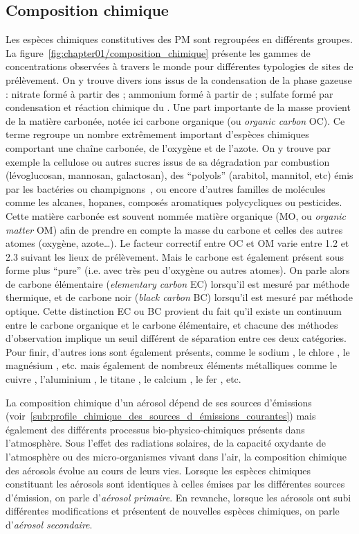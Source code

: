 \subsection{Composition chimique}%
\label{ssub:composition_chimique}

Les espèces chimiques constitutives des PM sont regroupées en différents groupes. La
figure~\ref{fig:chapter01/composition_chimique} présente les gammes de concentrations
observées à travers le monde pour différentes typologies de sites de prélèvement.
On y trouve divers ions issus de la condensation de la phase gazeuse : nitrate \NOt{} formé à
partir des ; ammonium \NHq{} formé à partir de \NHt; sulfate \SOq{} formé par
condensation et réaction chimique du .
Une part importante de la masse provient de la matière carbonée, notée ici
carbone organique (ou \textit{organic carbon} OC). Ce terme regroupe un nombre extrêmement
important d'espèces chimiques comportant une chaîne carbonée, de l'oxygène et
de l'azote. On y trouve par exemple la cellulose ou autres sucres issus de sa
dégradation par combustion (lévoglucosan, mannosan, galactosan), des ``polyols'' (arabitol,
mannitol, etc) émis par les bactéries ou champignons~\autocite{samakePolyols2019}, ou encore
d'autres familles de molécules comme les alcanes, hopanes, composés aromatiques
polycycliques ou pesticides. Cette matière carbonée est souvent nommée matière
organique (MO, ou \textit{organic matter} OM) afin de prendre en compte la masse du
carbone et celles des autres atomes (oxygène, azote…). Le facteur correctif entre OC et OM
varie entre 1.2 et 2.3 suivant les lieux de prélèvement.
Mais le carbone est également présent sous forme plus ``pure'' (i.e. avec très peu
d'oxygène ou autres atomes).
On parle alors de carbone élémentaire (\textit{elementary carbon} EC) lorsqu'il est mesuré
par méthode thermique, et de carbone noir (\textit{black carbon} BC) lorsqu'il est mesuré
par méthode optique. Cette distinction EC ou BC provient du fait qu'il existe un continuum
entre le carbone organique et le carbone élémentaire, et chacune des méthodes
d'observation implique un seuil différent de séparation entre ces deux catégories.
Pour finir, d'autres ions sont également présents, comme le sodium , le chlore
, le magnésium , etc. mais également de nombreux éléments métalliques
comme le cuivre , l'aluminium , le titane , le calcium , le fer
, etc.

La composition chimique d'un aérosol dépend de ses sources d'émissions
(voir~\ref{sub:profile_chimique_des_sources_d_émissions_courantes}) mais également des
différents processus bio-physico-chimiques présents dans l'atmosphère. Sous l'effet des
radiations solaires, de la capacité oxydante de l'atmosphère ou des micro-organismes
vivant dans l'air, la composition chimique des aérosols évolue au cours de leurs vies.
Lorsque les espèces chimiques constituant les aérosols sont identiques à celles émises par
les différentes sources d'émission, on parle d'\textit{aérosol primaire}. En revanche,
lorsque les aérosols ont subi différentes modifications et présentent de nouvelles espèces
chimiques, on parle d'\textit{aérosol secondaire}.


